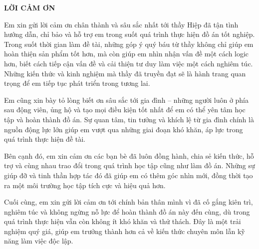 \documentclass[../DoAn.tex]{subfiles}
\begin{document}
\begin{center}
    \Large{\textbf{LỜI CẢM ƠN}}\\
\end{center}
\vspace{1cm}
Em xin gửi lời cảm ơn chân thành và sâu sắc nhất tới thầy Hiệp đã tận tình hướng dẫn, chỉ bảo và hỗ trợ em trong suốt quá trình thực hiện đồ án tốt nghiệp. Trong suốt thời gian làm đề tài, những góp ý quý báu từ thầy không chỉ giúp em hoàn thiện sản phẩm tốt hơn, mà còn giúp em nhìn nhận vấn đề một cách logic hơn, biết cách tiếp cận vấn đề và cải thiện tư duy làm việc một cách nghiêm túc. Những kiến thức và kinh nghiệm mà thầy đã truyền đạt sẽ là hành trang quan trọng để em tiếp tục phát triển trong tương lai.

Em cũng xin bày tỏ lòng biết ơn sâu sắc tới gia đình – những người luôn ở phía sau động viên, ủng hộ và tạo mọi điều kiện tốt nhất để em có thể yên tâm học tập và hoàn thành đồ án. Sự quan tâm, tin tưởng và khích lệ từ gia đình chính là nguồn động lực lớn giúp em vượt qua những giai đoạn khó khăn, áp lực trong quá trình thực hiện đề tài.

Bên cạnh đó, em xin cảm ơn các bạn bè đã luôn đồng hành, chia sẻ kiến thức, hỗ trợ và cùng nhau trao đổi trong quá trình học tập cũng như làm đồ án. Những sự giúp đỡ và tinh thần hợp tác đó đã giúp em có thêm góc nhìn mới, đồng thời tạo ra một môi trường học tập tích cực và hiệu quả hơn.

Cuối cùng, em xin gửi lời cảm ơn tới chính bản thân mình vì đã cố gắng kiên trì, nghiêm túc và không ngừng nỗ lực để hoàn thành đồ án này đến cùng, dù trong quá trình thực hiện vẫn còn không ít khó khăn và thử thách. Đây là một trải nghiệm quý giá, giúp em trưởng thành hơn cả về kiến thức chuyên môn lẫn kỹ năng làm việc độc lập.
\end{document}
